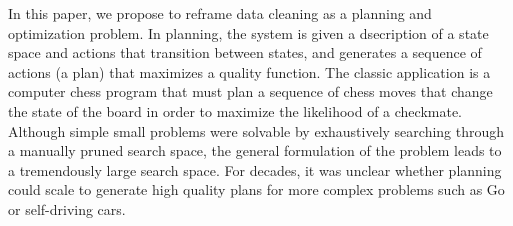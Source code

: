 


In this paper, we propose to reframe data cleaning as a planning and optimization problem.  In planning, the system is given a dsecription of a state space and actions that transition between states, and generates a sequence of actions (a plan) that maximizes a quality function. The classic application is a computer chess program that must plan a sequence of chess moves that change the state of the board in order to maximize the likelihood of a checkmate. Although simple small problems were solvable by exhaustively searching through a manually pruned search space, the general formulation of the problem leads to a tremendously large search space.  For decades, it was unclear whether planning could scale to generate high quality plans for more complex problems such as Go or self-driving cars.

